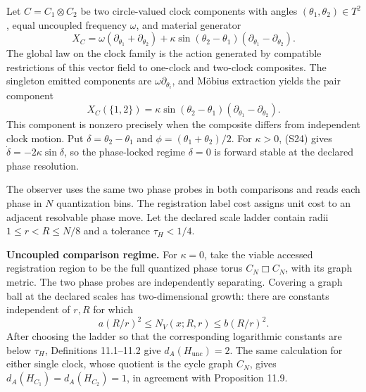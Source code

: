 \documentclass[11pt]{article}
\theoremstyle{definition}
\begin{document}
Let $C = C_1 \otimes C_2$ be two circle-valued clock components with angles $(\theta_1, \theta_2) \in T^2$, equal uncoupled frequency $\omega$, and material generator
\begin{equation}
X_C = \omega(\partial_{\theta_1} + \partial_{\theta_2}) + \kappa \sin(\theta_2 - \theta_1)(\partial_{\theta_1} - \partial_{\theta_2}). \tag{S24}
\end{equation}
The global law on the clock family is the action generated by compatible restrictions of this vector field to one-clock and two-clock composites. The singleton emitted components are $\omega \partial_{\theta_i}$, and M\"obius extraction yields the pair component
\begin{equation}
X_C(\{1, 2\}) = \kappa \sin(\theta_2 - \theta_1)(\partial_{\theta_1} - \partial_{\theta_2}). \tag{S25}
\end{equation}
This component is nonzero precisely when the composite differs from independent clock motion. Put $\delta = \theta_2 - \theta_1$ and $\phi = (\theta_1 + \theta_2)/2$. For $\kappa > 0$, (S24) gives $\dot{\delta} = -2\kappa \sin\delta$, so the phase-locked regime $\delta = 0$ is forward stable at the declared phase resolution.

The observer uses the same two phase probes in both comparisons and reads each phase in $N$ quantization bins. The registration label cost assigns unit cost to an adjacent resolvable phase move. Let the declared scale ladder contain radii $1 \leq r < R \leq N/8$ and a tolerance $\tau_H < 1/4$.

\noindent\textbf{Uncoupled comparison regime.} For $\kappa = 0$, take the viable accessed registration region to be the full quantized phase torus $C_N \Box C_N$, with its graph metric. The two phase probes are independently separating. Covering a graph ball at the declared scales has two-dimensional growth: there are constants independent of $r, R$ for which
\begin{equation}
a(R/r)^2 \leq N_V(x; R, r) \leq b(R/r)^2. \tag{S26}
\end{equation}
After choosing the ladder so that the corresponding logarithmic constants are below $\tau_H$, Definitions 11.1--11.2 give $d_A(H_{\mathrm{unc}}) = 2$. The same calculation for either single clock, whose quotient is the cycle graph $C_N$, gives $d_A(H_{C_1}) = d_A(H_{C_2}) = 1$, in agreement with Proposition 11.9.
\end{document}
